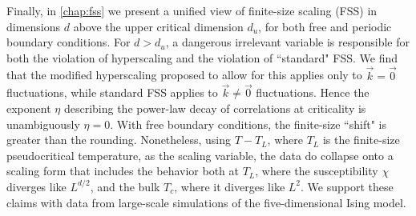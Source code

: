   Finally, in \cref{chap:fss} we present a unified view of finite-size scaling
  (FSS) in dimensions $d$ above the upper critical dimension $d_u$, for both
  free and periodic boundary conditions. For $d>d_u$, a dangerous irrelevant
  variable is responsible for both the violation of hyperscaling and the
  violation of ``standard" FSS. We find that the modified hyperscaling proposed
  to allow for this applies only to $\vec{k}=\vec{0}$ fluctuations, while
  standard FSS applies to $\vec{k}\neq\vec{0}$ fluctuations. Hence the exponent
  $\eta$ describing the power-law decay of correlations at criticality is
  unambiguously $\eta=0$. With free boundary conditions, the finite-size
  ``shift" is greater than the rounding. Nonetheless, using $T-T_L$, where
  $T_L$ is the finite-size pseudocritical temperature, as the scaling variable,
  the data do collapse onto a scaling form that includes the behavior both at
  $T_L$, where the susceptibility $\chi$ diverges like $L^{d/2}$, and the bulk
  $T_c$, where it diverges like $L^2$. We support these claims with data from
  large-scale simulations of the five-dimensional Ising model.



